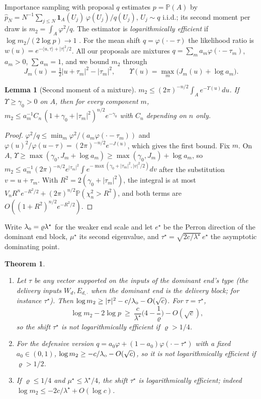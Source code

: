 \documentclass[pdflatex,sn-mathphys-ay]{sn-jnl}%
\theoremstyle{thmstyleone}%
\newtheorem{theorem}{Theorem}
\newtheorem{lemma}{Lemma}
\theoremstyle{thmstylethree}%
\theoremstyle{thmstyletwo}%
\renewcommand{\P}{\mathbb{P}}
\newcommand{\one}{\mathbf{1}}
\newcommand{\ip}[2]{\langle #1,#2\rangle}
\begin{document}
Importance sampling with proposal $q$ estimates $p=\P(A)$ by
$\hat p_N=N^{-1}\sum_{j\le N}\one_A(U_j)\,\varphi(U_j)/q(U_j)$, $U_j\sim q$ i.i.d.; its second
moment per draw is $m_2=\int_A\varphi^2/q$. The estimator is \emph{logarithmically
efficient} if $\log m_2/(2\log p)\to1$ \citep{AsmussenGlynn2007}. For the mean shift
$q=\varphi(\cdot-\tau)$ the likelihood ratio is $w(u)=e^{-\ip u\tau+|\tau|^2/2}$. All our
proposals are mixtures $q=\sum_ma_m\varphi(\cdot-\tau_m)$, $a_m>0$, $\sum a_m=1$, and we
bound $m_2$ through
\[
J_m(u)=\tfrac12|u+\tau_m|^2-|\tau_m|^2,\qquad \Upsilon(u)=\max_m\big(J_m(u)+\log a_m\big).
\]

\begin{lemma}[Second moment of a mixture]\label{lem:m2}
$m_2\le(2\pi)^{-n/2}\int_Ae^{-\Upsilon(u)}du$. If $\Upsilon\ge\gamma_0>0$ on $A$, then for every
component $m$,
$m_2\le a_m^{-1}C_n\,(1+\gamma_0+|\tau_m|^2)^{n/2}e^{-\gamma_0}$ with $C_n$ depending on $n$
only.
\end{lemma}

\begin{proof}
$\varphi^2/q\le\min_m\varphi^2/(a_m\varphi(\cdot-\tau_m))$ and
$\varphi(u)^2/\varphi(u-\tau)=(2\pi)^{-n/2}e^{-J(u)}$, which gives the first bound. Fix $m$.
On $A$, $\Upsilon\ge\max(\gamma_0,J_m+\log a_m)\ge\max(\gamma_0,J_m)+\log a_m$, so
$m_2\le a_m^{-1}(2\pi)^{-n/2}e^{|\tau_m|^2}\int e^{-\max(\gamma_0+|\tau_m|^2,|v|^2/2)}dv$
after the substitution $v=u+\tau_m$. With $R^2=2(\gamma_0+|\tau_m|^2)$, the integral is
at most $V_nR^ne^{-R^2/2}+(2\pi)^{n/2}\P(\chi^2_n>R^2)$, and both terms are
$O((1+R^2)^{n/2}e^{-R^2/2})$.
\end{proof}

Write $\lambda_{\rm o}=\varrho\lambda^\star$ for the weaker end scale and let $e^\star$ be
the Perron direction of the dominant end block, $\mu^\star$ its second eigenvalue, and
$\tau^\star=\sqrt{2c/\lambda^\star}\,e^\star$ the asymptotic dominating point.

\begin{theorem}\label{thm:single}
\begin{enumerate}
\item[(a)] Let $\tau$ be any vector supported on the inputs of the dominant end's type
(the delivery inputs $W_d,E_{d,\cdot}$ when the dominant end is the delivery block; for
instance $\tau^\star$). Then
$\log m_2\ge|\tau|^2-c/\lambda_{\rm o}-O(\sqrt c)$. For $\tau=\tau^\star$,
\[
\log m_2-2\log p\ \ge\ \frac{c}{\lambda^\star}\Big(4-\frac1\varrho\Big)-O(\sqrt c),
\]
so the shift $\tau^\star$ is not logarithmically efficient if $\varrho>1/4$.
\item[(b)] For the defensive version $q=a_0\varphi+(1-a_0)\varphi(\cdot-\tau^\star)$ with a
fixed $a_0\in(0,1)$, $\log m_2\ge-c/\lambda_{\rm o}-O(\sqrt c)$, so it is not
logarithmically efficient if $\varrho>1/2$.
\item[(c)] If $\varrho\le1/4$ and $\mu^\star\le\lambda^\star/4$, the shift $\tau^\star$ is
logarithmically efficient; indeed $\log m_2\le-2c/\lambda^\star+O(\log c)$.
\end{enumerate}
\end{theorem}
\end{document}
